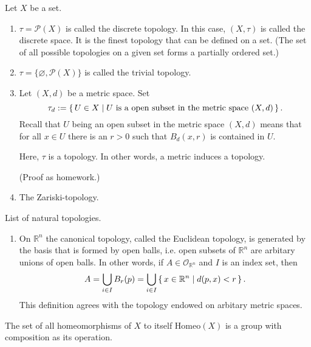 \begin{example}
    Let \(X\) be a {\color{mathif}set}.
    \begin{enumerate}
        \item \(\tau = \mathcal{P}(X)\) is called the {\color{maththen}discrete topology}. In this case, \((X, \tau)\) is called the {\color{maththen}discrete space}. It is the {\color{mathrem}finest topology} that can be defined on a set. (The set of all possible topologies on a given set forms a partially ordered set.)
        \item \(\tau = \{\varnothing, \mathcal{P}(X)\}\) is called the {\color{maththen}trivial topology}.
        \item Let \((X, d)\) be a {\color{mathif}metric space}. Set
        \begin{equation}
            \tau_d := \left\{\, U \in X \mid U \text{ is a open subset in the metric space } (X, d) \,\right\} \text{.}
        \end{equation}
        Recall that \(U\) being an open subset in the metric space \((X, d)\) means that for all \(x \in U\) there is an \(r > 0\) such that \(B_d(x, r)\) is contained in \(U\).

        Here, \(\tau\) is a topology. In other words, a metric induces a topology.

        (Proof as homework.)
        \item The Zariski-topology.
    \end{enumerate}
\end{example}

\begin{example}
    List of natural topologies.
    \begin{enumerate}
        \item On \(\mathbb{R}^n\) the canonical topology, called the Euclidean topology, is generated by the basis that is formed by open balls, i.e. open subsets of \(\mathbb{R}^n\) are arbitary unions of open balls. In other words, if \(A \in \mathcal{O}_{\mathbb{R}^n}\) and \(I\) is an index set, then
        \begin{equation*}
            A = \bigcup_{i \in I} B_r(p) = \bigcup_{i \in I} \left\{\, x \in \mathbb{R}^n \mid d(p, x) < r \,\right\} \text{.}
        \end{equation*}
        This definition agrees with the topology endowed on arbitary metric spaces.
    \end{enumerate}
\end{example}

\begin{remark}
    The set of all homeomorphisms of \(X\) to itself \(\mathrm{Homeo}(X)\) is a group with composition as its operation.
\end{remark}

